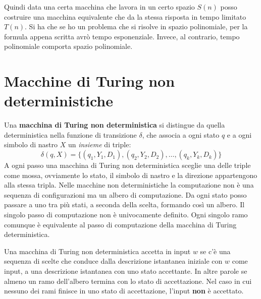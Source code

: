 Quindi data una certa macchina che lavora in un certo spazio $S(n)$ posso costruire
una macchina equivalente che da la stessa risposta in tempo limitato $T(n)$. Si ha 
che se ho un problema che si risolve in spazio polinomiale, per la formula appena 
scritta avrò tempo esponenziale. Invece, al contrario, tempo polinomiale comporta 
spazio polinomiale.
\section{Macchine di Turing non deterministiche}
Una \textbf{macchina di Turing non deterministica} si distingue da quella 
deterministica nella funzione di transizione $\delta$, che associa a ogni stato
 $q$ e a ogni simbolo di nastro $X$ un \textit{insieme} di triple:
\begin{equation}
    \delta(q, X) = \{(q_1, Y_1, D_1), (q_2, Y_2, D_2), \dots, (q_k, Y_k, D_k)\}
\end{equation}
A ogni passo una macchina di Turing non deterministica sceglie una delle triple 
come mossa, ovviamente lo stato, il simbolo di nastro e la direzione appartengono 
alla stessa tripla. Nelle macchine non deterministiche la computazione non è una 
sequenza di configurazioni ma un albero di computazione. Da ogni stato posso passare 
a uno tra più stati, a seconda della scelta, formando così un albero. Il singolo 
passo di computazione non è univocamente definito. Ogni singolo ramo comunque è 
equivalente al passo di computazione della macchina di Turing deterministica.

Una macchina di Turing non deterministica accetta in input $w$ se c'è una sequenza 
di scelte che conduce dalla descrizione istantanea iniziale con $w$ come input,
 a una descrizione istantanea con uno stato accettante. In altre parole se almeno 
 un ramo dell'albero termina con lo stato di accettazione. Nel caso in cui nessuno 
 dei rami finisce in uno stato di accettazione, l'input \textbf{non} è accettato.

